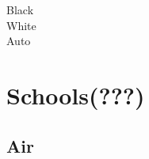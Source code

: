 \documentclass[twoside]{book}
\begin{document}
\begin{description}
    
  \item[Black] 
  \item[White] 
  \item[Auto] 
\end{description}
  
    

\section{Schools(???)}
    
    

\subsection{Air}
    
\end{document}
